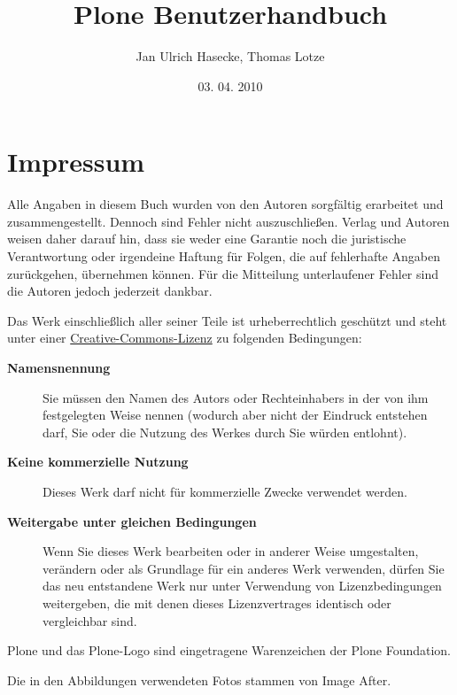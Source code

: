 \documentclass[a4paper,12pt,ngerman]{manual}
\title{Plone Benutzerhandbuch}
\date{03. 04. 2010}
\author{Jan Ulrich Hasecke, Thomas Lotze}
\begin{document}
\maketitle
\tableofcontents
\hypertarget{--doc-index}{}


\resetcurrentobjects
\hypertarget{--doc-Disclaimer}{}

\chapter{Impressum}

Alle Angaben in diesem Buch wurden von den Autoren sorgfältig
erarbeitet und zusammengestellt. Dennoch sind Fehler nicht
auszuschließen. Verlag und Autoren weisen daher darauf hin, dass sie
weder eine Garantie noch die juristische Verantwortung oder irgendeine
Haftung für Folgen, die auf fehlerhafte Angaben zurückgehen,
übernehmen können. Für die Mitteilung unterlaufener Fehler sind die
Autoren jedoch jederzeit dankbar.

Das Werk einschließlich aller seiner Teile ist urheberrechtlich
geschützt und steht unter einer \href{http://creativecommons.org/licenses/by-nc-sa/2.0/de/}{Creative-Commons-Lizenz} zu folgenden
Bedingungen:
\begin{description}
\item[\textbf{Namensnennung}] \leavevmode
Sie müssen den Namen des Autors oder Rechteinhabers in der von ihm
festgelegten Weise nennen (wodurch aber nicht der Eindruck entstehen darf,
Sie oder die Nutzung des Werkes durch Sie würden entlohnt).

\item[\textbf{Keine kommerzielle Nutzung}] \leavevmode
Dieses Werk darf nicht für kommerzielle Zwecke verwendet werden.

\item[\textbf{Weitergabe unter gleichen Bedingungen}] \leavevmode
Wenn Sie dieses Werk bearbeiten oder in anderer Weise umgestalten,
verändern oder als Grundlage für ein anderes Werk verwenden, dürfen Sie
das neu entstandene Werk nur unter Verwendung von Lizenzbedingungen
weitergeben, die mit denen dieses Lizenzvertrages identisch oder
vergleichbar sind.

\end{description}

Plone und das Plone-Logo sind eingetragene Warenzeichen der Plone Foundation.

Die in den Abbildungen verwendeten Fotos stammen von Image After.
\end{document}
